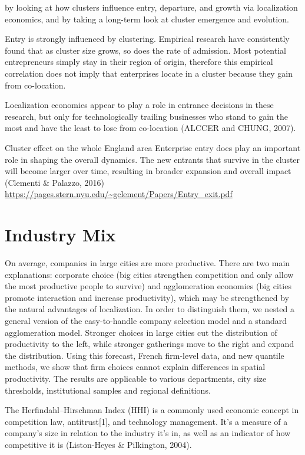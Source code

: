 \documentclass[
  12pt,
  oneside]{book}
\begin{document}
by looking at how clusters influence entry, departure, and growth via localization economics, and by taking a long-term look at cluster emergence and evolution.

Entry is strongly influenced by clustering. Empirical research have consistently found that as cluster size grows, so does the rate of admission. Most potential entrepreneurs simply stay in their region of origin, therefore this empirical correlation does not imply that enterprises locate in a cluster because they gain from co-location.

Localization economies appear to play a role in entrance decisions in these research, but only for technologically trailing businesses who stand to gain the most and have the least to lose from co-location (ALCCER and CHUNG, 2007).

Cluster effect on the whole England area
Enterprise entry does play an important role in shaping the overall dynamics. The new entrants that survive in the cluster will become larger over time, resulting in broader expansion and overall impact (Clementi \& Palazzo, 2016)
\url{https://pages.stern.nyu.edu/~gclement/Papers/Entry_exit.pdf}

\hypertarget{industry-mix}{%
\section{Industry Mix}\label{industry-mix}}

On average, companies in large cities are more productive. There are two main explanations: corporate choice (big cities strengthen competition and only allow the most productive people to survive) and agglomeration economies (big cities promote interaction and increase productivity), which may be strengthened by the natural advantages of localization. In order to distinguish them, we nested a general version of the easy-to-handle company selection model and a standard agglomeration model. Stronger choices in large cities cut the distribution of productivity to the left, while stronger gatherings move to the right and expand the distribution. Using this forecast, French firm-level data, and new quantile methods, we show that firm choices cannot explain differences in spatial productivity. The results are applicable to various departments, city size thresholds, institutional samples and regional definitions.

The Herfindahl--Hirschman Index (HHI) is a commonly used economic concept in competition law, antitrust{[}1{]}, and technology management. It's a measure of a company's size in relation to the industry it's in, as well as an indicator of how competitive it is \hspace{0pt}(Liston-Heyes \& Pilkington, 2004).
\end{document}
